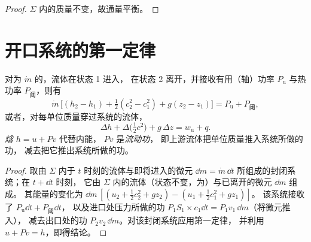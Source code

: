 \begin{proof}
$\Sigma$ 内的质量不变，故通量平衡。
\end{proof}

\section{开口系统的第一定律}

\begin{theorem}[单股稳定流动的能量平衡]\label{thm:b2:open-systems:firstlaw}
对为 $\dot m$ 的，流体在状态 1 进入，
在状态 2 离开，并接收有用（轴）功率
$P_{\text{u}}$ 与热功率 $P_{\text{阈}}$，则有
\[
\dot m\,\Big[(h_2 - h_1) + \tfrac12(c_2^2 - c_1^2) + g(z_2 - z_1)\Big]
= P_{\text{u}} + P_{\text{阈}} ,
\]
或者，对每单位质量穿过系统的流体，
\[
\Delta h + \Delta\big(\tfrac12c^2\big) + g\,\Delta z = w_{\text{u}} + q .
\]
\emph{焓} $h = u + Pv$ 代替内能，
$Pv$ 是\emph{流动功}，
即上游流体把单位质量推入系统所做的功，
减去把它推出系统所做的功。
\end{theorem}

\begin{proof}
取由 $\Sigma$ 内于 $t$ 时刻的流体与即将进入的微元
$\dd m = \dot m\,\dd t$ 所组成的封闭系统；在 $t + \dd t$ 时刻，
它由 $\Sigma$ 内的流体（状态不变，为）与已离开的微元 $\dd m$ 组成。
其能量的变化为
$\dd m\,[(u_2 + \tfrac12c_2^2 + gz_2) - (u_1 + \tfrac12c_1^2 + gz_1)]$。
该系统接收了 $P_{\text{u}}\dd t + P_{\text{阈}}\dd t$，
以及进口处压力所做的功 $P_1S_1 \times c_1\dd t = P_1v_1\,\dd m$（将微元推入），
减去出口处的功 $P_2v_2\,\dd m$。对该封闭系统应用第一定律，
并利用 $u + Pv = h$，即得结论。
\end{proof}

